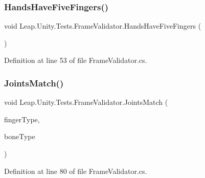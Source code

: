 \mbox{\label{class_leap_1_1_unity_1_1_tests_1_1_frame_validator_ab5dccd3893a86f0942bbabfb598c8617}} 
\subsubsection{\texorpdfstring{HandsHaveFiveFingers()}{HandsHaveFiveFingers()}}
{\footnotesize\ttfamily void Leap.\+Unity.\+Tests.\+Frame\+Validator.\+Hands\+Have\+Five\+Fingers (\begin{DoxyParamCaption}{ }\end{DoxyParamCaption})}



Definition at line 53 of file Frame\+Validator.\+cs.

\mbox{\label{class_leap_1_1_unity_1_1_tests_1_1_frame_validator_afa4f4cab5e0011f2b69b2d7f4f361fb0}} 
\subsubsection{\texorpdfstring{JointsMatch()}{JointsMatch()}}
{\footnotesize\ttfamily void Leap.\+Unity.\+Tests.\+Frame\+Validator.\+Joints\+Match (\begin{DoxyParamCaption}\item[{\mbox{[}\+Value\+Source(typeof(\+Frame\+Validator), \char`\"{}\+\_\+fingers\char`\"{})\mbox{]} \mbox{\hyperlink{class_leap_1_1_finger_ae75e8d46a01aff0bd5c6d6fb99e2f2ba}{Finger.\+Finger\+Type}}}]{finger\+Type,  }\item[{\mbox{[}\+Value\+Source(typeof(\+Frame\+Validator), \char`\"{}\+\_\+bones\char`\"{})\mbox{]} \mbox{\hyperlink{class_leap_1_1_bone_a21054e31cefa7b75f25a026006fdbb1b}{Bone.\+Bone\+Type}}}]{bone\+Type }\end{DoxyParamCaption})}



Definition at line 80 of file Frame\+Validator.\+cs.


